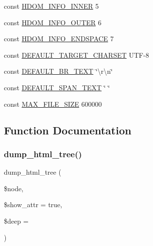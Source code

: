 \begin{DoxyCompactItemize}
\item 
const \hyperlink{simple__html__dom_8php_ab2b42db1e28668502af838f684ca5577}{H\+D\+O\+M\+\_\+\+I\+N\+F\+O\+\_\+\+I\+N\+N\+ER} 5
\item 
const \hyperlink{simple__html__dom_8php_a9261ef31b846c2545bd838f76d984938}{H\+D\+O\+M\+\_\+\+I\+N\+F\+O\+\_\+\+O\+U\+T\+ER} 6
\item 
const \hyperlink{simple__html__dom_8php_a45cce2cf42d5ed669087cad509c1476c}{H\+D\+O\+M\+\_\+\+I\+N\+F\+O\+\_\+\+E\+N\+D\+S\+P\+A\+CE} 7
\item 
const \hyperlink{simple__html__dom_8php_aeb01f6d83a65d695ad327473f838319a}{D\+E\+F\+A\+U\+L\+T\+\_\+\+T\+A\+R\+G\+E\+T\+\_\+\+C\+H\+A\+R\+S\+ET} \textquotesingle{}U\+TF-\/8\textquotesingle{}
\item 
const \hyperlink{simple__html__dom_8php_a898bdf60fe4d05c1c50013eed5e2c6e8}{D\+E\+F\+A\+U\+L\+T\+\_\+\+B\+R\+\_\+\+T\+E\+XT} \char`\"{}\textbackslash{}r\textbackslash{}n\char`\"{}
\item 
const \hyperlink{simple__html__dom_8php_a30d58d7d3a53efc61f064b53a434bafe}{D\+E\+F\+A\+U\+L\+T\+\_\+\+S\+P\+A\+N\+\_\+\+T\+E\+XT} \char`\"{} \char`\"{}
\item 
const \hyperlink{simple__html__dom_8php_ae0113eb729c51976f55df15ad1c644c7}{M\+A\+X\+\_\+\+F\+I\+L\+E\+\_\+\+S\+I\+ZE} 600000
\end{DoxyCompactItemize}


\subsection{Function Documentation}
\hypertarget{simple__html__dom_8php_a1f67414b1908776b16f3fc8c6953c13f}{}\label{simple__html__dom_8php_a1f67414b1908776b16f3fc8c6953c13f} 
\subsubsection{\texorpdfstring{dump\+\_\+html\+\_\+tree()}{dump\_html\_tree()}}
{\footnotesize\ttfamily dump\+\_\+html\+\_\+tree (\begin{DoxyParamCaption}\item[{}]{\$node,  }\item[{}]{\$show\+\_\+attr = {\ttfamily true},  }\item[{}]{\$deep = {} }\end{DoxyParamCaption})}



